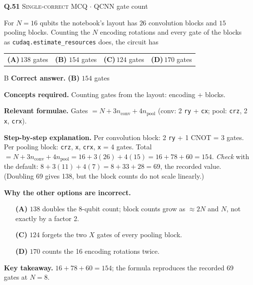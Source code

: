 \documentclass[11pt,a4paper]{article}
\newcommand{\optlabel}[1]{\textbf{(#1)}}
\newcommand{\correctlabel}[1]{\textcolor{okgreen}{\textbf{(#1)}\,\ding{51}}}
\newenvironment{qitem}[1]{\begin{list}{}{\setlength{\leftmargin}{3.3em}\setlength{\labelwidth}{3.1em}%
  \setlength{\labelsep}{0.2em}\setlength{\topsep}{3pt}\setlength{\parsep}{3pt}}\item[\textbf{Q.#1}\hfill]}{\end{list}}
\newcommand{\qsep}{\par\vspace{2pt}{\color{black!15}\hrule}\vspace{4pt}}
\newcommand{\qmeta}[2]{{\footnotesize\color{black!60}\textsc{#1} \;$\cdot$\; #2}\par}
\begin{document}
\begin{qitem}{51}
\qmeta{Single-correct MCQ}{QCNN gate count}
For $N = 16$ qubits the notebook's layout has $26$ convolution blocks and $15$ pooling blocks. Counting the $N$
encoding rotations and every gate of the blocks as \texttt{cudaq.estimate\_resources} does, the circuit has
\par\smallskip\noindent\begin{tabularx}{\linewidth}{@{}*{4}{L}@{}}
\optlabel{A}\,$138$ gates & \correctlabel{B}\,$154$ gates & \optlabel{C}\,$124$ gates & \optlabel{D}\,$170$ gates
\end{tabularx}
\end{qitem}
\begin{solbox}{B}
\textbf{\color{brand}Correct answer.} \textcolor{okgreen}{\textbf{(B)}} $154$ gates

\textbf{\color{brand}Concepts required.} Counting gates from the layout: encoding + blocks.

\textbf{\color{brand}Relevant formulae.} Gates $= N + 3n_{\text{conv}} + 4n_{\text{pool}}$ (conv: 2 \texttt{ry} + \texttt{cx}; pool: \texttt{crz}, 2 \texttt{x}, \texttt{crx}).

\textbf{\color{brand}Step-by-step explanation.} Per convolution block: 2 \texttt{ry} + 1 CNOT = 3 gates. Per pooling block: \texttt{crz}, \texttt{x}, \texttt{crx}, \texttt{x} = 4 gates.
Total $= N + 3n_{\text{conv}} + 4n_{\text{pool}} = 16 + 3(26) + 4(15) = 16 + 78 + 60 = 154$.
\emph{Check} with the default: $8 + 3(11) + 4(7) = 8 + 33 + 28 = 69$, the recorded value. (Doubling 69 gives 138, but the
block counts do not scale linearly.)

\textbf{\color{brand}Why the other options are incorrect.}
\begin{itemize}[leftmargin=2.4em, itemsep=1pt, topsep=2pt]
\item[\textbf{(A)}] $138$ doubles the 8-qubit count; block counts grow as $\approx 2N$ and $N$, not exactly by a factor 2.
\item[\textbf{(C)}] $124$ forgets the two $X$ gates of every pooling block.
\item[\textbf{(D)}] $170$ counts the 16 encoding rotations twice.
\end{itemize}
\textbf{\color{brand}Key takeaway.} $16 + 78 + 60 = 154$; the formula reproduces the recorded 69 gates at $N = 8$.
\end{solbox}
\qsep
\end{document}
